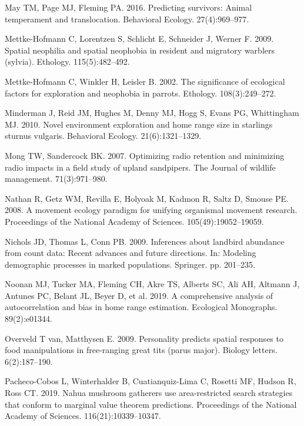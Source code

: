\documentclass[
]{article}
\begin{document}
\leavevmode\hypertarget{ref-may2016predicting}{}%
May TM, Page MJ, Fleming PA. 2016. Predicting survivors: Animal
temperament and translocation. Behavioral Ecology. 27(4):969--977.

\leavevmode\hypertarget{ref-mettke2009spatial}{}%
Mettke-Hofmann C, Lorentzen S, Schlicht E, Schneider J, Werner F. 2009.
Spatial neophilia and spatial neophobia in resident and migratory
warblers (sylvia). Ethology. 115(5):482--492.

\leavevmode\hypertarget{ref-mettke2002significance}{}%
Mettke-Hofmann C, Winkler H, Leisler B. 2002. The significance of
ecological factors for exploration and neophobia in parrots. Ethology.
108(3):249--272.

\leavevmode\hypertarget{ref-minderman2010novel}{}%
Minderman J, Reid JM, Hughes M, Denny MJ, Hogg S, Evans PG, Whittingham
MJ. 2010. Novel environment exploration and home range size in starlings
sturnus vulgaris. Behavioral Ecology. 21(6):1321--1329.

\leavevmode\hypertarget{ref-mong2007optimizing}{}%
Mong TW, Sandercock BK. 2007. Optimizing radio retention and minimizing
radio impacts in a field study of upland sandpipers. The Journal of
wildlife management. 71(3):971--980.

\leavevmode\hypertarget{ref-nathan2008movement}{}%
Nathan R, Getz WM, Revilla E, Holyoak M, Kadmon R, Saltz D, Smouse PE.
2008. A movement ecology paradigm for unifying organismal movement
research. Proceedings of the National Academy of Sciences.
105(49):19052--19059.

\leavevmode\hypertarget{ref-nichols2009inferences}{}%
Nichols JD, Thomas L, Conn PB. 2009. Inferences about landbird abundance
from count data: Recent advances and future directions. In: Modeling
demographic processes in marked populations. Springer. pp. 201--235.

\leavevmode\hypertarget{ref-noonan2019comprehensive}{}%
Noonan MJ, Tucker MA, Fleming CH, Akre TS, Alberts SC, Ali AH, Altmann
J, Antunes PC, Belant JL, Beyer D, et al. 2019. A comprehensive analysis
of autocorrelation and bias in home range estimation. Ecological
Monographs. 89(2):e01344.

\leavevmode\hypertarget{ref-van2009personality}{}%
Overveld T van, Matthysen E. 2009. Personality predicts spatial
responses to food manipulations in free-ranging great tits (parus
major). Biology letters. 6(2):187--190.

\leavevmode\hypertarget{ref-pacheco2019nahua}{}%
Pacheco-Cobos L, Winterhalder B, Cuatianquiz-Lima C, Rosetti MF, Hudson
R, Ross CT. 2019. Nahua mushroom gatherers use area-restricted search
strategies that conform to marginal value theorem predictions.
Proceedings of the National Academy of Sciences. 116(21):10339--10347.
\end{document}
